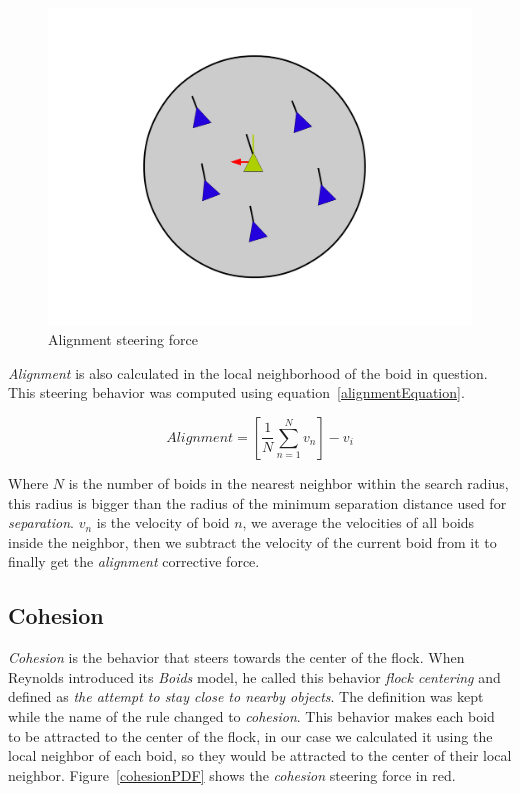 \begin{figure}[htbp]
\begin{center}
\includegraphics[scale=0.3]{figures/alignment.pdf}
\caption{Alignment steering force}
\label{alignmentPDF}
\end{center}
\end{figure}

\textit{Alignment} is also calculated in the local neighborhood of the boid in question. This steering behavior was computed using equation~\ref{alignmentEquation}.

\begin{equation}
\label{alignmentEquation}
Alignment = \left[  \frac{1}{N} \sum_{n=1}^{N} v_n \right ] - v_i
\end{equation}

Where $N$ is the number of boids in the nearest neighbor within the search radius, this radius is bigger than the radius of the minimum separation distance used for \textit{separation}. $v_n$ is the velocity of boid $n$, we average the velocities of all boids inside the neighbor, then we subtract the velocity of the current boid from it to finally get the \textit{alignment} corrective force.

\subsection{Cohesion}
\textit{Cohesion} is the behavior that steers towards the center of the flock. When Reynolds introduced its \textit{Boids} model, he called this behavior \textit{flock centering} and defined as \textit{the attempt to stay close to nearby objects}. The definition was kept while the name of the rule changed to \textit{cohesion}. This behavior makes each boid to be attracted to the center of the flock, in our case we calculated it using the local neighbor of each boid, so they would be attracted to the center of their local neighbor.  Figure~\ref{cohesionPDF} shows the \textit{cohesion} steering force in red.

